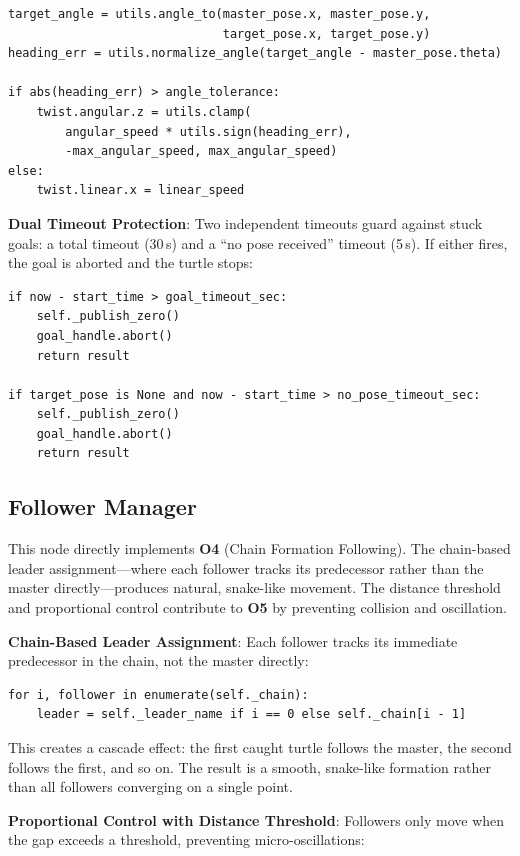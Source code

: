 \documentclass{article}
\begin{document}
\begin{homeworkProblem}[3]
\begin{verbatim}
target_angle = utils.angle_to(master_pose.x, master_pose.y,
                              target_pose.x, target_pose.y)
heading_err = utils.normalize_angle(target_angle - master_pose.theta)

if abs(heading_err) > angle_tolerance:
    twist.angular.z = utils.clamp(
        angular_speed * utils.sign(heading_err),
        -max_angular_speed, max_angular_speed)
else:
    twist.linear.x = linear_speed
\end{verbatim}

\textbf{Dual Timeout Protection}: Two independent timeouts guard against stuck goals: a total timeout (30\,s) and a ``no pose received'' timeout (5\,s). If either fires, the goal is aborted and the turtle stops:

\begin{verbatim}
if now - start_time > goal_timeout_sec:
    self._publish_zero()
    goal_handle.abort()
    return result

if target_pose is None and now - start_time > no_pose_timeout_sec:
    self._publish_zero()
    goal_handle.abort()
    return result
\end{verbatim}

\subsection{Follower Manager}

This node directly implements \textbf{O4} (Chain Formation Following). The chain-based leader assignment---where each follower tracks its predecessor rather than the master directly---produces natural, snake-like movement. The distance threshold and proportional control contribute to \textbf{O5} by preventing collision and oscillation.

\textbf{Chain-Based Leader Assignment}: Each follower tracks its immediate predecessor in the chain, not the master directly:

\begin{verbatim}
for i, follower in enumerate(self._chain):
    leader = self._leader_name if i == 0 else self._chain[i - 1]
\end{verbatim}

This creates a cascade effect: the first caught turtle follows the master, the second follows the first, and so on. The result is a smooth, snake-like formation rather than all followers converging on a single point.

\textbf{Proportional Control with Distance Threshold}: Followers only move when the gap exceeds a threshold, preventing micro-oscillations:


\end{homeworkProblem}
\end{document}

